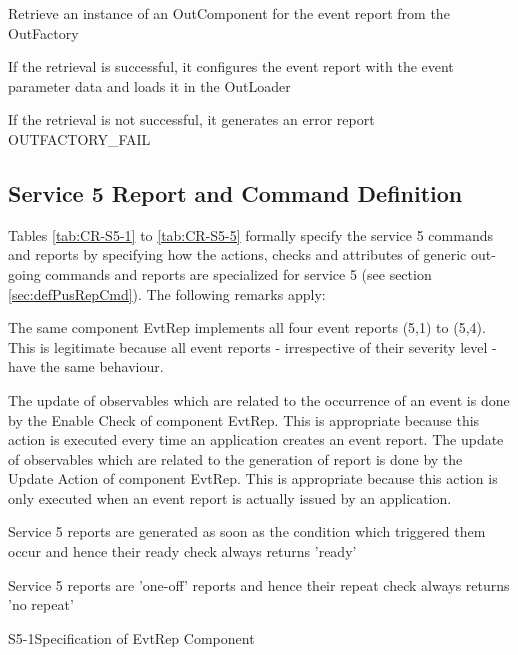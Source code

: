 \documentclass{pnp_article}
\begin{document}
\begin{fw_itemize}
\item Retrieve an instance of an OutComponent for the event report from the OutFactory
\item If the retrieval is successful, it configures the event report with the event parameter data and loads it in the OutLoader
\item If the retrieval is not successful, it generates an error report OUTFACTORY\_FAIL
\end{fw_itemize}


\subsection{Service 5 Report and Command Definition}\label{sec:serv5RepCmdDef}
Tables \ref{tab:CR-S5-1} to \ref{tab:CR-S5-5} formally specify the service 5 commands and reports by specifying how the actions, checks and attributes of generic out-going commands and reports are specialized for service 5 (see section \ref{sec:defPusRepCmd}). The following remarks apply:

\begin{fw_itemize}
\item The same component EvtRep implements all four event reports (5,1) to (5,4). This is legitimate because all event reports - irrespective of their severity level - have the same behaviour. 
\item The update of observables which are related to the occurrence of an event is done by the Enable Check of component EvtRep. This is appropriate because this action is executed every time an application creates an event report. The update of observables which are related to the generation of report is done by the Update Action of component EvtRep. This is appropriate because this action is only executed when an event report is actually issued by an application.
\item Service 5 reports are generated as soon as the condition which triggered them occur and hence their ready check always returns 'ready'
\item Service 5 reports are 'one-off' reports and hence their repeat check always returns 'no repeat'
\end{fw_itemize}


\begin{cr_rep}{S5-1}{Specification of EvtRep Component}
\end{cr_rep}
\end{document}
